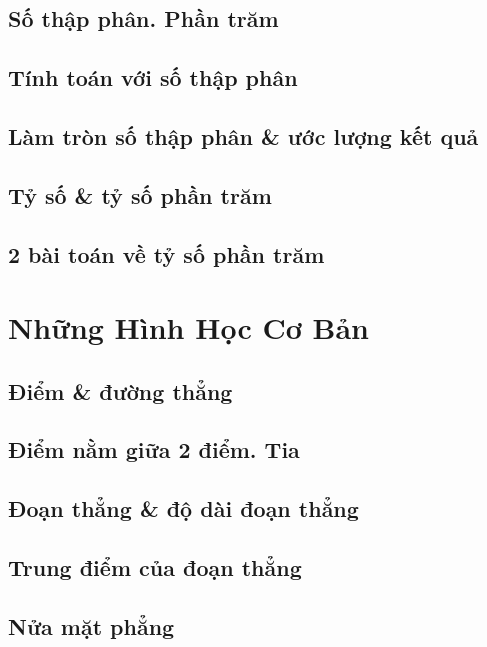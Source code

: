 \documentclass{article}
\numberwithin{equation}{section}
\begin{document}
\subsection{Số thập phân. Phần trăm}

\subsection{Tính toán với số thập phân}

\subsection{Làm tròn số thập phân \& ước lượng kết quả}

\subsection{Tỷ số \& tỷ số phần trăm}

\subsection{2 bài toán về tỷ số phần trăm}


\newpage
\section{Những Hình Học Cơ Bản}

\subsection{Điểm \& đường thẳng}

\subsection{Điểm nằm giữa 2 điểm. Tia}

\subsection{Đoạn thẳng \& độ dài đoạn thẳng}

\subsection{Trung điểm của đoạn thẳng}

\subsection{Nửa mặt phẳng}
\end{document}
